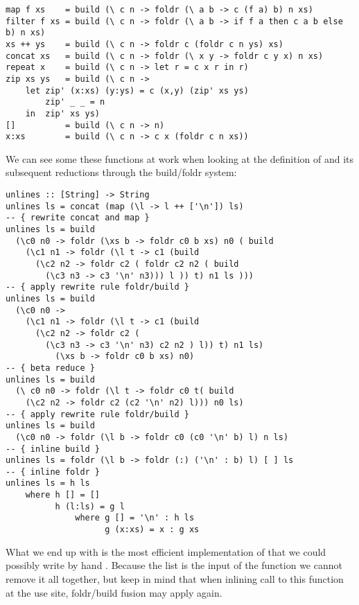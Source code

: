 \begin{listing}[H]
\begin{verbatim}
map f xs    = build (\ c n -> foldr (\ a b -> c (f a) b) n xs)
filter f xs = build (\ c n -> foldr (\ a b -> if f a then c a b else b) n xs)
xs ++ ys    = build (\ c n -> foldr c (foldr c n ys) xs)
concat xs   = build (\ c n -> foldr (\ x y -> foldr c y x) n xs)
repeat x    = build (\ c n -> let r = c x r in r)
zip xs ys   = build (\ c n -> 
    let zip' (x:xs) (y:ys) = c (x,y) (zip' xs ys)
        zip' _ _ = n
    in  zip' xs ys)
[]          = build (\ c n -> n)
x:xs        = build (\ c n -> c x (foldr c n xs))
\end{verbatim}
\end{listing}

We can see some these functions at work when looking at the definition of  and its subsequent
reductions through the build/foldr system:

\begin{listing}[H]
\begin{verbatim}
unlines :: [String] -> String
unlines ls = concat (map (\l -> l ++ ['\n']) ls)
-- { rewrite concat and map }
unlines ls = build
  (\c0 n0 -> foldr (\xs b -> foldr c0 b xs) n0 ( build
    (\c1 n1 -> foldr (\l t -> c1 (build
      (\c2 n2 -> foldr c2 ( foldr c2 n2 ( build
        (\c3 n3 -> c3 '\n' n3))) l )) t) n1 ls )))
-- { apply rewrite rule foldr/build }
unlines ls = build
  (\c0 n0 ->
    (\c1 n1 -> foldr (\l t -> c1 (build
      (\c2 n2 -> foldr c2 (
        (\c3 n3 -> c3 '\n' n3) c2 n2 ) l)) t) n1 ls)
          (\xs b -> foldr c0 b xs) n0)
-- { beta reduce }
unlines ls = build
  (\ c0 n0 -> foldr (\l t -> foldr c0 t( build
    (\c2 n2 -> foldr c2 (c2 '\n' n2) l))) n0 ls)
-- { apply rewrite rule foldr/build }
unlines ls = build
  (\c0 n0 -> foldr (\l b -> foldr c0 (c0 '\n' b) l) n ls)
-- { inline build }
unlines ls = foldr (\l b -> foldr (:) ('\n' : b) l) [ ] ls
-- { inline foldr }
unlines ls = h ls
    where h [] = []
          h (l:ls) = g l
              where g [] = '\n' : h ls
                    g (x:xs) = x : g xs
\end{verbatim}
\end{listing}

What we end up with is the most efficient implementation of  that we could possibly write by hand \cite{shortcut_fusion}.
Because the list  is the input of the function we cannot remove it all together, but keep in mind that when inlining call to this function
at the use site, foldr/build fusion may apply again. 

